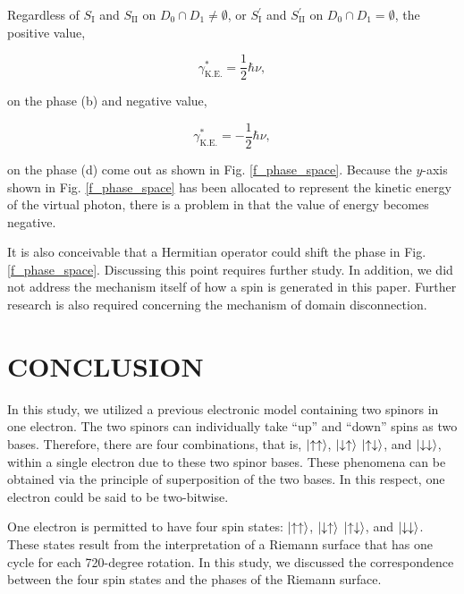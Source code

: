 \documentclass[reprint,amsmath,amssymb,aps,]{revtex4-1}
\numberwithin{equation}{section}%
\begin{document}
    Regardless of $S_{\mathrm{I}}$ and $S_{\mathrm{II}}$ on $D_{0} \cap D_{1} \neq \emptyset$, or $S^{\prime}_{\mathrm{I}}$ and $S^{\prime}_{\mathrm{II}}$ on $D_{0} \cap D_{1} = \emptyset$, the positive value,
    
    \begin{equation}
        \gamma^{*}_{\mathrm{K.E.}} = \frac{1}{2} \hbar \nu
        ,
    \end{equation}
    
    \noindent
    on the phase (b) and negative value,

    \begin{equation}
        \gamma^{*}_{\mathrm{K.E.}} = - \frac{1}{2} \hbar \nu
        ,
    \end{equation}

    \noindent
    on the phase (d) come out as shown in Fig. \ref{f_phase_space}. Because the $y$-axis shown in Fig. \ref{f_phase_space} has been allocated to represent the kinetic energy of the virtual photon, there is a problem in that the value of energy becomes negative.

    It is also conceivable that a Hermitian operator could shift the phase in Fig. \ref{f_phase_space}. Discussing this point requires further study. In addition, we did not address the mechanism itself of how a spin is generated in this paper. Further research is also required concerning the mechanism of domain disconnection.


\section{\label{sec:CONCLUSION}CONCLUSION}

    In this study, we utilized a previous electronic model containing two spinors in one electron. The two spinors can individually take ``up'' and ``down'' spins as two bases. Therefore, there are four combinations, that is, $\ket{\uparrow \uparrow}$, $\ket{\downarrow \uparrow}$ $\ket{\uparrow \downarrow}$, and $\ket{\downarrow \downarrow}$, within a single electron due to these two spinor bases. These phenomena can be obtained via the principle of superposition of the two bases. In this respect, one electron could be said to be two-bitwise.
    
    One electron is permitted to have four spin states: $\ket{\uparrow \uparrow}$, $\ket{\downarrow \uparrow}$ $\ket{\uparrow \downarrow}$, and $\ket{\downarrow \downarrow}$. These states result from the interpretation of a Riemann surface that has one cycle for each 720-degree rotation. In this study, we discussed the correspondence between the four spin states and the phases of the Riemann surface.
    
\end{document}
